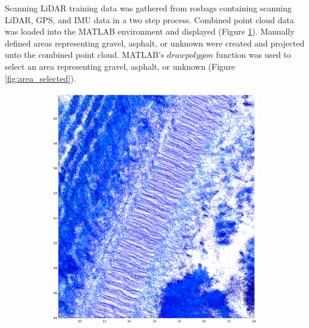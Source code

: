 \documentclass[numbered,pdftex]{ohio-etd}
\begin{document}
{{{{				{Scanning LiDAR training data was gathered from rosbags containing scanning LiDAR, GPS, and IMU data in a two step process. Combined point cloud data was loaded into the MATLAB environment and displayed (Figure \ref{fig:pre_select_area}). Manually defined areas representing gravel, asphalt, or unknown were created and projected unto the combined point cloud. MATLAB's $drawpolygon$ function was used to select an area representing gravel, asphalt, or unknown (Figure \ref{fig:area_selected}).}
	
				\begin{figure}[H]
					\centering
					\begin{subfigure}{0.45\textwidth}
						\centering
						\includegraphics[width=1.0\linewidth]{Defense_Images/pre_select_area}
						\caption[Road area on Point Cloud]{}
						\label{fig:pre_select_area}
					\end{subfigure}
					\begin{subfigure}{0.45\textwidth}
						\centering

\end{subfigure}
\end{figure}}}}}
\end{document}
